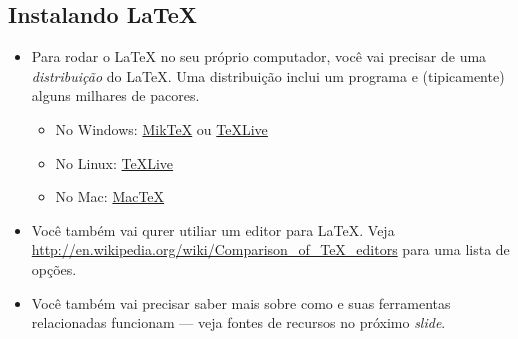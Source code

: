 \documentclass{beamer}
\begin{document}
\subsection{Instalando \LaTeX{}}
\begin{frame}{\insertsubsection}
\begin{itemize}
\item Para rodar o  \LaTeX{} no seu próprio computador, você vai precisar de uma \emph{distribuição} do \LaTeX{}. Uma distribuição inclui  um programa  e (tipicamente) alguns milhares de pacores.
\begin{itemize}
\item No Windows: \href{http://miktex.org/}{Mik\TeX} ou \href{http://tug.org/texlive/}{\TeX Live}
\item No Linux: \href{http://tug.org/texlive/}{\TeX Live}
\item No Mac: \href{http://tug.org/mactex/}{Mac\TeX}
\end{itemize} 
\item Você também vai qurer utiliar um editor para \LaTeX{}. Veja \url{http://en.wikipedia.org/wiki/Comparison_of_TeX_editors} para uma lista de opções.
\item Você também vai precisar saber mais sobre como  e suas ferramentas relacionadas funcionam --- veja fontes de recursos no próximo \emph{slide}.
\end{itemize}
\end{frame}

\end{document}
